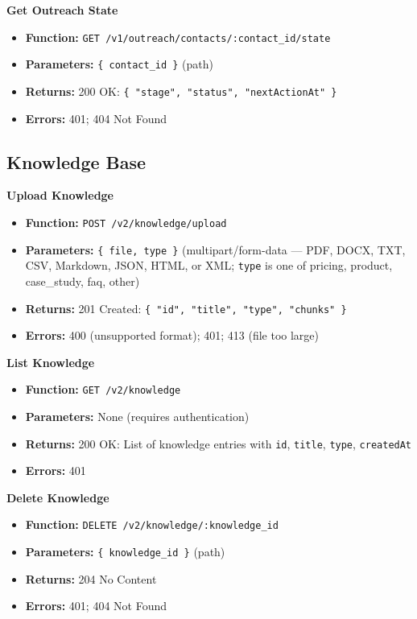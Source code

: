 \documentclass[a4paper]{article}
\begin{document}
\textbf{Get Outreach State}
\begin{itemize}
  \item \textbf{Function:} \texttt{GET /v1/outreach/contacts/:contact\_id/state}
  \item \textbf{Parameters:} \texttt{\{ contact\_id \}} (path)
  \item \textbf{Returns:} 200 OK: \texttt{\{ "stage", "status", "nextActionAt" \}}
  \item \textbf{Errors:} 401; 404 Not Found
\end{itemize}

\subsection{Knowledge Base}

\textbf{Upload Knowledge}
\begin{itemize}
  \item \textbf{Function:} \texttt{POST /v2/knowledge/upload}
  \item \textbf{Parameters:} \texttt{\{ file, type \}} (multipart/form-data --- PDF, DOCX, TXT, CSV, Markdown, JSON, HTML, or XML; \texttt{type} is one of pricing, product, case\_study, faq, other)
  \item \textbf{Returns:} 201 Created: \texttt{\{ "id", "title", "type", "chunks" \}}
  \item \textbf{Errors:} 400 (unsupported format); 401; 413 (file too large)
\end{itemize}

\textbf{List Knowledge}
\begin{itemize}
  \item \textbf{Function:} \texttt{GET /v2/knowledge}
  \item \textbf{Parameters:} None (requires authentication)
  \item \textbf{Returns:} 200 OK: List of knowledge entries with \texttt{id}, \texttt{title}, \texttt{type}, \texttt{createdAt}
  \item \textbf{Errors:} 401
\end{itemize}

\textbf{Delete Knowledge}
\begin{itemize}
  \item \textbf{Function:} \texttt{DELETE /v2/knowledge/:knowledge\_id}
  \item \textbf{Parameters:} \texttt{\{ knowledge\_id \}} (path)
  \item \textbf{Returns:} 204 No Content
  \item \textbf{Errors:} 401; 404 Not Found
\end{itemize}
\end{document}
